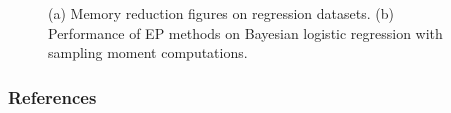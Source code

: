 \documentclass{article} %
\begin{document}
\begin{figure}
\centering
%
\begin{minipage}[!t]{0.5\linewidth}
\end{minipage}
%
\hspace{0.3in}
%
\begin{minipage}[!t]{0.35\linewidth}
\def\svgwidth{0.7\linewidth}
\subfigure[\label{fig:sep_logit}]{

}
\end{minipage}
%
\caption{(a) Memory reduction figures on regression datasets. (b) Performance of EP methods on Bayesian logistic regression with sampling moment computations.}
\end{figure}


\subsubsection*{References}
\renewcommand{\section}[2]{}


\end{document}

